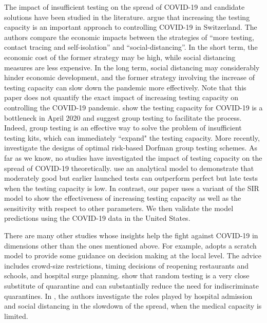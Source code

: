 \documentclass[nonblindrev, copyedit]{informs3a}
\begin{document}
The impact of insufficient testing on the spread of COVID-19 and candidate solutions have been studied in the literature.
\citet{salathe2020covid} argue that increasing the testing capacity is an important approach to controlling COVID-19 in Switzerland.
The authors compare the economic impacts between the strategies of ``more testing, contact tracing and self-isolation'' and ``social-distancing''.
In the short term, the economic cost of the former strategy may be high, while social distancing measures are less expensive.
In the long term, social distancing may considerably hinder economic development, and the former strategy involving the increase of testing capacity can slow down the pandemic more effectively.
Note that this paper does not quantify the exact impact of increasing testing capacity on controlling the COVID-19 pandemic.
\citet{gollier2020group} show the testing capacity for COVID-19 is a bottleneck in April 2020 and suggest group testing to facilitate the process.
Indeed, group testing is an effective way to solve the problem of insufficient testing kits, which can immediately ``expand" the testing capacity.
More recently, \citet{aprahamian2019optimal} investigate the designs of optimal risk-based Dorfman group testing schemes.
As far as we know, no studies have investigated the impact of testing capacity on the spread of COVID-19 theoretically.
\citet{Drakopoulos2020why} use an analytical model to demonstrate that moderately good but earlier launched tests can outperform perfect but late tests when the testing capacity is low.
In contrast, our paper uses a variant of the SIR model to show the effectiveness of increasing testing capacity as well as the sensitivity with respect to other parameters.
We then validate the model predictions using the COVID-19 data in the United States.




There are many other studies whose insights help the fight against COVID-19 in dimensions other than the ones mentioned above. For example,
\citet{kaplan2020covid} adopts a scratch model to provide some guidance on decision making at the local level. The advice includes crowd-size restrictions, timing decisions of reopening restaurants and schools, and hospital surge planning. \citet{piguillem2020optimal} show that random testing is a very close substitute of quarantine and can substantially reduce the need for indiscriminate quarantines.
In \citet{chen2020hospital}, the authors investigate the roles played by hospital admission and social distancing in the slowdown of the spread, when the medical capacity is limited.
\end{document}
